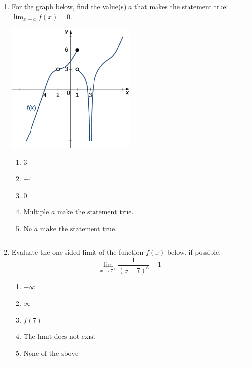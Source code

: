 \documentclass[14pt]{extbook}
\newcommand{\litem}[1]{\item#1\hspace*{-1cm}\rule{\textwidth}{0.4pt}}
\begin{document}
\begin{enumerate}
\litem{
For the graph below, find the value(s) $a$ that makes the statement true: $ \displaystyle \lim_{x \rightarrow a} f(x) = 0$.
\begin{center}
    \includegraphics[width=0.5\textwidth]{../Figures/evaluateLimitGraphicallyB.png}
\end{center}
\begin{enumerate}[label=\Alph*.]
\item \( 3 \)
\item \( -4 \)
\item \( 0 \)
\item \( \text{Multiple } a \text{ make the statement true}. \)
\item \( \text{No } a \text{ make the statement true}. \)

\end{enumerate} }
\litem{
Evaluate the one-sided limit of the function $f(x)$ below, if possible.\[ \lim_{x \rightarrow 7^+} \frac{1}{(x-7)^6}+1 \]\begin{enumerate}[label=\Alph*.]
\item \( -\infty \)
\item \( \infty \)
\item \( f(7) \)
\item \( \text{The limit does not exist} \)
\item \( \text{None of the above} \)


\end{enumerate}}
\end{enumerate}
\end{document}
